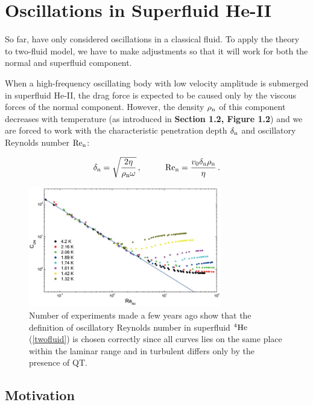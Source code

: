 \section{Oscillations in Superfluid He-II}

So far, have only considered oscillations in a classical fluid. To apply the theory to two-fluid model, we have to make adjustments so that it will work for both the normal and superfluid component.

When a high-frequency oscillating body with low velocity amplitude is submerged in superfluid He-II, the drag force is expected to be caused only by the viscous forces of the normal component. However, the density $ \rho_{\mathrm{n}} $ of this component decreases with temperature (as introduced in {\sffamily\textbf{Section 1.2, Figure 1.2}}) and we are forced to work with the characteristic penetration depth $\delta_{\mathrm{n}}$ and oscillatory Reynolds number $\mathrm{Re}_{\mathrm{n}}$:

\begin{equation}
\delta_{\mathrm{n}} = \sqrt{\frac{2\eta}{\rho_{\mathrm{n}}\omega}}\,,
\hspace{1cm}
\mathrm{Re}_{\mathrm{n}} = \frac{v_0 \delta_{\mathrm{n}} \rho_{\mathrm{n}}}{\eta}
\label{twofluid}\,.
\end{equation}



\begin{figure}[h]
	\centering
	\includegraphics[width=0.75\textwidth]{graphics/C_Re}
	\caption{Number of experiments made a few years ago show that the definition of oscillatory Reynolds number in superfluid $ {}^4\mathrm{He} $ (\ref{twofluid}) is chosen correctly since all curves lies on the same place within the laminar range and in turbulent differs only by the presence of QT. }
\end{figure}



\subsection*{Motivation}

